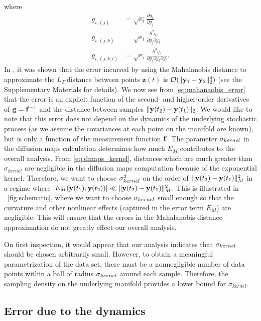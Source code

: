 %
where
%
\begin{equation}
\begin{aligned}
g_{i,(j)} &= \sqrt{e_i} \frac{\partial g_i}{\partial y_j}
\\
g_{i,(j,k)} &= \sqrt{e_i}  \frac{\partial^2 g_i}{\partial y_j \partial y_k}
\\
g_{i,(j,k,l)} &= \sqrt{e_i}  \frac{\partial^3 g_i}{\partial y_j \partial y_k \partial y_l} .
\end{aligned}
\end{equation}
%
In \cite{singer2008non}, it was shown that the error incurred by using the Mahalanobis distance to approximate the $L_2$-distance between points $\mathbf{z}(t)$ is $\mathcal{O} (\|\mathbf{y}_1 - \mathbf{y}_2 \|_2^4 )$ (see the Supplementary Materials for details).
%
We now see from \eqref{eq:mahanaobis_error} that the error is an explicit function of the second- and higher-order derivatives of $\mathbf{g} = \mathbf{f}^{-1}$ and the distance between samples $\| \mathbf{y}(t_2) - \mathbf{y}(t_1) \|_2$.
%
We would like to note that this error does not depend on the dynamics of the underlying stochastic process (as we assume the covariances at each point on the manifold are known), but is only a function of the measurement function $\mathbf{f}$.
%
The parameter $\sigma_{kernel}$ in the diffusion maps calculation determines how much $E_M$ contributes to the overall analysis.
%
From \eqref{eq:dmaps_kernel}, distances which are much greater than $\sigma_{kernel}$ are negligible in the diffusion maps computation because of the exponential kernel.
%
Therefore, we want to choose $\sigma_{kernel}^2$ on the order of $\|\mathbf{y}(t_2) - \mathbf{y}(t_1)\|^2_M$ in a regime where $| E_M(\mathbf{y}(t_1), \mathbf{y}(t_2))|  \ll \|\mathbf{y}(t_2) - \mathbf{y}(t_1)\|^2_M$.
%
This is illustrated in \fig~\ref{fig:schematic}, where we want to choose $\sigma_{kernel}$ small enough so that the curvature and other nonlinear effects (captured in the error term $E_M$) are negligible.
%
This will ensure that the errors in the Mahalanobis distance approximation do not greatly effect our overall analysis.

On first inspection, it would appear that our analysis indicates that $\sigma_{kernel}$ should be chosen arbitrarily small.
%
However, to obtain a meaningful parametrization of the data set, there must be a nonnegligible number of data points within a ball of radius $\sigma_{kernel}$ around each sample.
%
Therefore, the sampling density on the underlying manifold provides a lower bound for $\sigma_{kernel}$.

\subsection{Error due to the dynamics} \label{subsec:cov_est}

